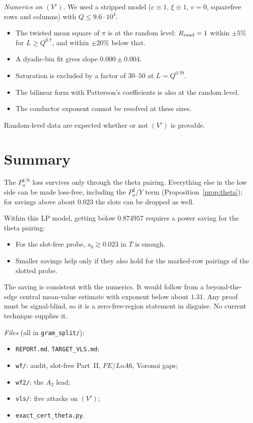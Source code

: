 \documentclass[11pt]{article}
\theoremstyle{definition}
\theoremstyle{remark}
\begin{document}
\noindent\emph{Numerics on $(V')$.} We used a stripped model ($c\equiv1$, $\xi\equiv1$, $v=0$, squarefree rows and columns) with $Q\le9.6\cdot10^4$.
\begin{itemize}[leftmargin=*]
\item The twisted mean square of $\pi$ is at the random level: $R_{\rm rand}=1$ within $\pm5\%$ for $L\ge Q^{0.7}$, and within $\pm20\%$ below that.
\item A dyadic-bin fit gives slope $0.000\pm0.004$.
\item Saturation is excluded by a factor of $30$--$50$ at $L=Q^{0.79}$.
\item The bilinear form with Patterson's coefficients is also at the random level.
\item The conductor exponent cannot be resolved at these sizes.
\end{itemize}
Random-level data are expected whether or not $(V')$ is provable.

\section{Summary}

The $P_a^{1/6}$ loss survives only through the theta pairing. Everything else in the low side can be made loss-free, including the $P_a^2/Y$ term (Proposition~\ref{prop:theta}); for savings above about $0.023$ the slots can be dropped as well.

Within this LP model, getting below $0.874957$ requires a power saving for the theta pairing:
\begin{itemize}[leftmargin=*]
\item For the slot-free probe, $s_0\gtrsim0.023$ in $T$ is enough.
\item Smaller savings help only if they also hold for the marked-row pairings of the slotted probe.
\end{itemize}

The saving is consistent with the numerics. It would follow from a beyond-the-edge central mean-value estimate with exponent below about $1.31$. Any proof must be signal-blind, so it is a zero-free-region statement in disguise. No current technique supplies it.

\medskip
\noindent\emph{Files} (all in \texttt{gram\_split/}):
\begin{itemize}[leftmargin=*]
\item \texttt{REPORT.md}, \texttt{TARGET\_VLS.md};
\item \texttt{wf/}: audit, slot-free Part~II, $FE$/$LoA6$, Voronoi gaps;
\item \texttt{wf2/}: the $A_2$ lead;
\item \texttt{vls/}: five attacks on $(V')$;
\item \texttt{exact\_cert\_theta.py}.
\end{itemize}
\end{document}

